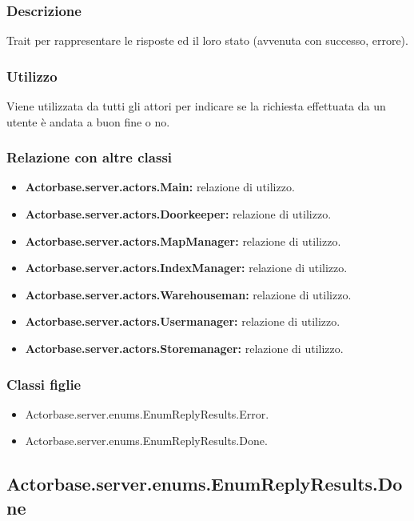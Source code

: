 \documentclass[a4paper]{article}
\begin{document}
			\subsubsection{Descrizione}
				Trait per rappresentare le risposte ed il loro stato (avvenuta con successo, errore). 
				
			\subsubsection{Utilizzo}
				Viene utilizzata da tutti gli attori per indicare se la richiesta effettuata da un utente è andata a buon fine o no.
				
			\subsubsection{Relazione con altre classi}
				\begin{itemize}
					\item \textbf{Actorbase.server.actors.Main:} relazione di utilizzo.
					\item \textbf{Actorbase.server.actors.Doorkeeper:} relazione di utilizzo.
					\item \textbf{Actorbase.server.actors.MapManager:} relazione di utilizzo.
					\item \textbf{Actorbase.server.actors.IndexManager:} relazione di utilizzo.
					\item \textbf{Actorbase.server.actors.Warehouseman:} relazione di utilizzo.
					\item \textbf{Actorbase.server.actors.Usermanager:} relazione di utilizzo.
					\item \textbf{Actorbase.server.actors.Storemanager:} relazione di utilizzo.
				\end{itemize}
				
			\subsubsection{Classi figlie}
				\begin{itemize}
					\item Actorbase.server.enums.EnumReplyResults.Error.
					\item Actorbase.server.enums.EnumReplyResults.Done.
				\end{itemize}				
						

		
		\subsection{Actorbase.server.enums.EnumReplyResults.Done}
\end{document}
